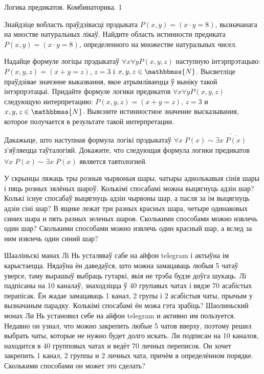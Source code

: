 \documentclass[11pt, a4paper]{article}
\begin{document}
    
{Логика предикатов. Комбинаторика.}
{1}

\begin{problemList}

\problemItemSimple
{Знайдзіце вобласть праўдзівасці прэдыката $P(x, y) = (x \cdot y = 8)$, вызначанага на мностве натуральных лікаў.}
{Найдите область истинности предиката $P(x, y) = (x \cdot y = 8)$, определенного на множестве натуральных чисел.}

\bigskip

\problemItemSimple
{Надайце формуле логіцы прэдыкатаў $\forall x \forall y P(x, y, z)$ наступную інтэрпрэтацыю: $P(x, y, z) = (x + y = z)$, $z = 3$ і $x, y, z \in \mathbbmss{N}$.
Высветліце праўдзівае значэнне выказвання, якое атрымліваецца ў выніку такой інтэрпрэтацыі.}
{Придайте формуле логики предикатов $\forall x \forall y P(x, y, z)$ следующую интерпретацию: $P(x, y, z) = (x + y = z)$, $z = 3$ и $x, y, z \in \mathbbmss{N}$.
Выясните истинностное значение высказывания, которое получается в результате такой интерпретации.}

\bigskip

\problemItemSimple
{Дакажыце, што наступная формула логікі прэдыкатаў $\forall x\;P(x) \sim \overline{\exists x\;\overline{P(x)}}$ з'яўляецца таўталогіяй.}
{Докажите, что следующая формула логики предикатов $\forall x\;P(x) \sim \overline{\exists x\;\overline{P(x)}}$ является тавтологией.}

\bigskip

\problemItemSimple
{У скрынцы ляжаць тры розныя чырвоныя шары, чатыры аднолькавыя сінія шары і пяць розных зялёных шароў.
Колькімі спосабамі можна выцягнуць адзін шар? Колькі існуе спосабаў выцягнуць адзін чырвоны шар,
а пасля за ім выцягнуць адзін сіні шар?}
{В ящике лежат три разных красных шара, четыре одинаковых синих шара и пять разных зеленых шаров.
Сколькими способами можно извлечь один шар?
Сколькими способами можно извлечь один красный шар, а вслед за ним извлечь один синий шар?}

\bigskip

\problemItemSimple
{Шааліньскі манах Лі Нь усталяваў сабе на айфон telegram і актыўна ім карыстаецца.
Нядаўна ён даведаўся, што можна замацаваць любыя 5 чатаў уверсе, таму вырашыў выбраць гутаркі, якія не трэба будзе доўга шукаць.
Лі падпісаны на 10 каналаў, знаходзіцца ў 40 групавых чатах і вядзе 70 асабістых перапісак.
Ён жадае замацаваць 1 канал, 2 групы і 2 асабістыя чаты, прычым у вызначаным парадку.
Колькімі спосабамі ён можа гэта зрабіць?}
{Шаолиньский монах Ли Нь установил себе на айфон telegram и активно им пользуется.
Недавно он узнал, что можно закрепить любые 5 чатов вверху, поэтому решил выбрать чаты, которые не нужно будет долго искать.
Ли подписан на 10 каналов, находится в 40 групповых чатах и ведёт 70 личных переписок.
Он хочет закрепить 1 канал, 2 группы и 2 личных чата, причём в определённом порядке.
Сколькими способами он может это сделать?}


\end{problemList}
\end{document}
